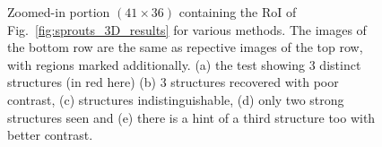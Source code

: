 \documentclass[journal]{IEEEtran}
\begin{document}
\begin{figure}[!h]
              \hfill
                \hfill
{}
\caption{Zoomed-in portion $(41 \times 36)$ containing the RoI of Fig.~\ref{fig:sprouts_3D_results} for various methods. The images of the bottom row are the same as repective images of the top row, with regions marked additionally. (a) the test showing 3 distinct structures (in red here) (b) 3 structures recovered with poor contrast, (c) structures indistinguishable, (d) only two strong structures seen and (e) there is a hint of a third structure too with better contrast.}
\label{fig:sprouts_zoomed_3D_results}
\end{figure}
\end{document}

